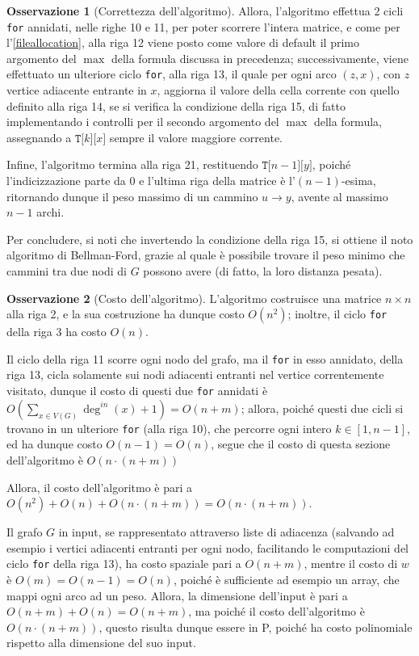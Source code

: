 \documentclass[14pt]{extreport}
\theoremstyle{definition}
\theoremstyle{definition}
\newtheorem{remark}{Osservazione}[subsection]
\begin{document}
\begin{remark}[Correttezza dell'algoritmo]
    Allora, l'algoritmo effettua 2 cicli \texttt{for} annidati, nelle righe 10 e 11, per poter scorrere l'intera matrice, e come per l'\cref{fileallocation}, alla riga 12 viene posto come valore di default il primo argomento del $\max$ della formula discussa in precedenza; successivamente, viene effettuato un ulteriore ciclo \texttt{for}, alla riga 13, il quale per ogni arco $(z, x)$, con $z$ vertice adiacente entrante in $x$, aggiorna il valore della cella corrente con quello definito alla riga 14, se si verifica la condizione della riga 15, di fatto implementando i controlli per il secondo argomento del $\max$ della formula, assegnando a $\texttt{T[}k\texttt{][}x\texttt{]}$ sempre il valore maggiore corrente.

    Infine, l'algoritmo termina alla riga 21, restituendo $\texttt{T[}n - 1\texttt{][}y\texttt{]}$, poiché l'indicizzazione parte da $0$ e l'ultima riga della matrice è l'$(n - 1)$-esima, ritornando dunque il peso massimo di un cammino $u \rightarrow y$, avente al massimo $n - 1$ archi.

    Per concludere, si noti che invertendo la condizione della riga 15, si ottiene il noto algoritmo di Bellman-Ford, grazie al quale è possibile trovare il peso minimo che cammini tra due nodi di $G$ possono avere (di fatto, la loro distanza pesata).
\end{remark}

\begin{remark}[Costo dell'algoritmo]
    L'algoritmo costruisce una matrice $n \times n$ alla riga 2, e la sua costruzione ha dunque costo $O(n^2)$; inoltre, il ciclo \texttt{for} della riga 3 ha costo $O(n)$.

    Il ciclo della riga 11 scorre ogni nodo del grafo, ma il \texttt{for} in esso annidato, della riga 13, cicla solamente sui nodi adiacenti entranti nel vertice correntemente visitato, dunque il costo di questi due \texttt{for} annidati è $\displaystyle O\left(\sum_{x \in V(G)}{\deg^{in}(x) + 1} \right) = O(n + m)$; allora, poiché questi due cicli si trovano in un ulteriore \texttt{for} (alla riga 10), che percorre ogni intero $k \in [1, n- 1]$, ed ha dunque costo $O(n - 1) = O(n)$, segue che il costo di questa sezione dell'algoritmo è $O(n \cdot (n + m))$

    Allora, il costo dell'algoritmo è pari a $O(n ^2) + O(n) + O(n \cdot(n + m)) = O(n \cdot (n + m))$.

    Il grafo $G$ in input, se rappresentato attraverso liste di adiacenza (salvando ad esempio i vertici adiacenti entranti per ogni nodo, facilitando le computazioni del ciclo \texttt{for} della riga 13), ha costo spaziale pari a $O(n + m)$, mentre il costo di $w$ è $O(m) = O(n - 1) = O(n)$, poiché è sufficiente ad esempio un array, che mappi ogni arco ad un peso. Allora, la dimensione dell'input è pari a $O(n + m) + O(n) = O(n + m)$, ma poiché il costo dell'algoritmo è $O(n \cdot (n + m))$, questo risulta dunque essere in P, poiché ha costo polinomiale rispetto alla dimensione del suo input.
\end{remark}
\end{document}
